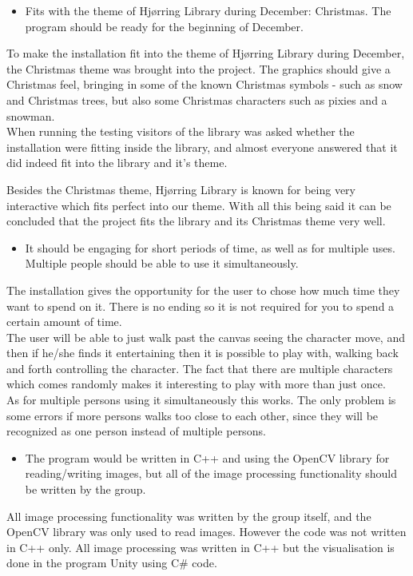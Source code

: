 \begin{itemize}
\item Fits with the theme of Hj{\o}rring Library during December: Christmas. The program should be ready for the beginning of December.
\end{itemize}
To make the installation fit into the theme of Hj{\o}rring Library during December, the Christmas theme was brought into the project. The graphics should give a Christmas feel, bringing in some of the known Christmas symbols - such as snow and Christmas trees, but also some Christmas characters such as pixies and a snowman.\\
When running the testing visitors of the library was asked whether the installation were fitting inside the library, and almost everyone answered that it did indeed fit into the library and it's theme.

Besides the Christmas theme, Hj{\o}rring Library is known for being very interactive which fits perfect into our theme. With all this being said it can be concluded that the project fits the library and its Christmas theme very well.

\begin{itemize}
\item It should be engaging for short periods of time, as well as for multiple uses. Multiple people should be able to use it simultaneously.
\end{itemize}
The installation gives the opportunity for the user to chose how much time they want to spend on it. There is no ending so it is not required for you to spend a certain amount of time. \\
The user will be able to just walk past the canvas seeing the character move, and then if he/she finds it entertaining then it is possible to play with, walking back and forth controlling the character. The fact that there are multiple characters which comes randomly makes it interesting to play with more than just once.\\
As for multiple persons using it simultaneously this works. The only problem is some errors if more persons walks too close to each other, since they will be recognized as one person instead of multiple persons.

\begin{itemize}
\item The program would be written in C++ and using the OpenCV library for reading/writing images, but all of the image processing functionality should be written by the group.
\end{itemize}
All image processing functionality was written by the group itself, and the OpenCV library was only used to read images. However the code was not written in C++ only. All image processing was written in C++ but the visualisation is done in the program Unity using C\# code.

